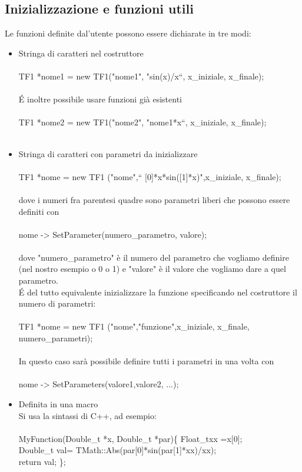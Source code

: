 \documentclass[10pt,a4paper]{article}
\begin{document}
\subsection{Inizializzazione e funzioni utili}
Le funzioni definite dal'utente possono essere dichiarate in tre modi:
\begin{itemize}
	\item Stringa di caratteri nel costruttore\\\\
	TF1 *nome1 = new TF1("nome1", "sin(x)/x“, x\_iniziale, x\_finale);\\\\
	\'{E} inoltre possibile usare funzioni già esistenti\\\\
	TF1 *nome2 = new TF1("nome2", "nome1*x“, x\_iniziale, x\_finale);\\\\
	\item Stringa di caratteri con parametri da inizializzare\\\\
	TF1 *nome = new TF1 ("nome",“ [0]*x*sin([1]*x)",x\_iniziale, x\_finale);\\\\
	dove i numeri fra parentesi quadre sono parametri liberi che possono essere definiti con\\\\
	nome -> SetParameter(numero\_parametro, valore);\\\\
	dove "numero\_parametro" è il numero del parametro che vogliamo definire (nel nostro esempio o 0 o 1) e "valore" è il valore che vogliamo dare a quel parametro.\\
	\'{E} del tutto equivalente inizializzare la funzione specificando nel costruttore il numero di parametri:\\\\
	TF1 *nome = new TF1 ("nome","funzione",x\_iniziale, x\_finale, numero\_parametri);\\\\
	In questo caso sarà possibile definire tutti i parametri in una volta con\\\\
	nome -> SetParameters(valore1,valore2, ...);\\
	\item Definita in una macro\\
	Si usa la sintassi di C++, ad esempio:\\\\
	MyFunction(Double\_t *x, Double\_t *par)\{
		 Float\_txx =x[0];\\
		 Double\_t val= TMath::Abs(par[0]*sin(par[1]*xx)/xx);\\
		 return val;
		 \};\\
\end{itemize}
\end{document}
